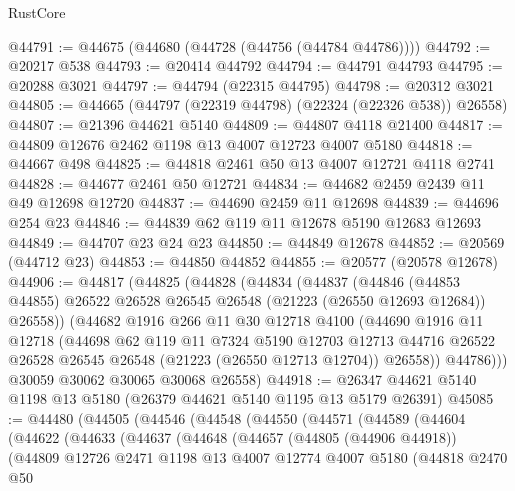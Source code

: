 \begin{lexlean}{RustCore}
\begin{coremodule}
@44791 := @44675 (@44680 (@44728 (@44756 (@44784 @44786))))
@44792 := @20217 @538
@44793 := @20414 @44792
@44794 := @44791 @44793
@44795 := @20288 @3021
@44797 := @44794 (@22315 @44795)
@44798 := @20312 @3021
@44805 := @44665 (@44797 (@22319 @44798) (@22324 (@22326 @538)) @26558)
@44807 := @21396 @44621 @5140
@44809 := @44807 @4118 @21400
@44817 := @44809 @12676 @2462 @1198 @13 @4007 @12723 @4007 @5180
@44818 := @44667 @498
@44825 := @44818 @2461 @50 @13 @4007 @12721 @4118 @2741
@44828 := @44677 @2461 @50 @12721
@44834 := @44682 @2459 @2439 @11 @49 @12698 @12720
@44837 := @44690 @2459 @11 @12698
@44839 := @44696 @254 @23
@44846 := @44839 @62 @119 @11 @12678 @5190 @12683 @12693
@44849 := @44707 @23 @24 @23
@44850 := @44849 @12678
@44852 := @20569 (@44712 @23)
@44853 := @44850 @44852
@44855 := @20577 (@20578 @12678)
@44906 := @44817
    (@44825
      (@44828
        (@44834
          (@44837
            (@44846
              (@44853 @44855)
              @26522
              @26528
              @26545
              @26548
              (@21223 (@26550 @12693 @12684))
              @26558))
          (@44682
            @1916
            @266
            @11
            @30
            @12718
            @4100
            (@44690
              @1916
              @11
              @12718
              (@44698
                @62
                @119
                @11
                @7324
                @5190
                @12703
                @12713
                @44716
                @26522
                @26528
                @26545
                @26548
                (@21223 (@26550 @12713 @12704))
                @26558))
            @44786)))
      @30059
      @30062
      @30065
      @30068
      @26558)
@44918 := @26347 @44621 @5140 @1198 @13 @5180 (@26379 @44621 @5140 @1195 @13 @5179 @26391)
@45085 := @44480
    (@44505
      (@44546
        (@44548
          (@44550
            (@44571
              (@44589
                (@44604
                  (@44622
                    (@44633
                      (@44637
                        (@44648
                          (@44657
                            (@44805 (@44906 @44918))
                            (@44809
                              @12726
                              @2471
                              @1198
                              @13
                              @4007
                              @12774
                              @4007
                              @5180
                              (@44818
                                @2470
                                @50

\end{coremodule}
\end{lexlean}
